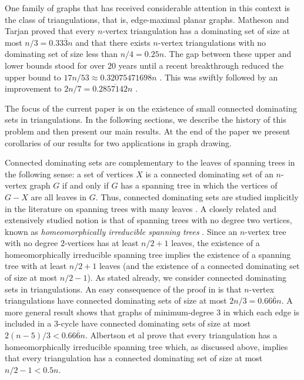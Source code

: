 \documentclass[a4paper,UKenglish, cleveref, autoref, thm-restate]{lipics-v2021}
\begin{document}
One family of graphs that has received considerable attention in this context is the class of triangulations, that is, edge-maximal planar graphs. Matheson and Tarjan \cite{matheson.tarjan:dominating} proved that every $n$-vertex triangulation has a dominating set of size at most $n/3=0.33\overline{3}n$ and that there exists $n$-vertex triangulations with no dominating set of size less than $n/4=0.25n$. The gap between these upper and lower bounds stood for over $20$ years until a recent breakthrough  reduced the upper bound to $17n/53\approx 0.32075471698n$ \cite{spacapan:domination}.  This was swiftly followed by an improvement to $2n/7= 0.2\overline{857142}n$  \cite{christiansen.rotenberg.ea:triangulations}.

The focus of the current paper is on the existence of small connected dominating sets in triangulations. In the following sections, we describe the history of this problem and then present our main results. At the end of the paper we present corollaries of our results for two applications in graph drawing. 

Connected dominating sets are complementary to the leaves of spanning trees in the following sense: a set of vertices $X$ is a connected dominating set of an $n$-vertex  graph $G$ if and only if $G$ has a spanning tree in which the vertices of $G-X$ are all leaves in $G$. Thus, connected dominating sets are studied implicitly in the literature on spanning trees with many leaves \cite{DBLP:journals/jgt/DingJS01, kleitman.west:spanning, doi:10.1137/100801251,doi:10.1137/060664318, DBLP:conf/esa/BousquetI0MOSW20, noguchi.zamfirescu:spanning}. A closely related and extensively studied notion is that of spanning trees with no degree two vertices, known as \emph{homeomorphically irreducible spanning trees} \cite{chen.ren.ea:homeomorphically,albertson.berman.ea:graphs,CHEN2013409, DBLP:journals/jgt/ItoT22, DBLP:journals/jgt/Hoffmann-Ostenhof18a, gessel2023good}.  Since an $n$-vertex tree with no degree $2$-vertices has at least $n/2+1$ leaves, the existence of a homeomorphically irreducible spanning tree implies the existence of a spanning tree with at least $n/2+1$ leaves (and the existence of a connected dominating set of size at most $n/2-1$). 
As stated already, we consider connected dominating sets in triangulations.  An easy consequence of the proof in \cite{matheson.tarjan:dominating} is that $n$-vertex triangulations have connected dominating sets of size at most $2n/3=0.66\overline{6}n$.  A more general result \cite{kleitman.west:spanning} shows that graphs of minimum-degree $3$ in which each edge is included in a $3$-cycle have connected dominating sets of size at most $2(n-5)/3<0.66\overline{6}n$. Albertson et al \cite{albertson.berman.ea:graphs} prove that every triangulation has a homeomorphically irreducible spanning tree which, as discussed above, implies that every triangulation has a connected dominating set of size at most $n/2-1<0.5n$.
\end{document}
